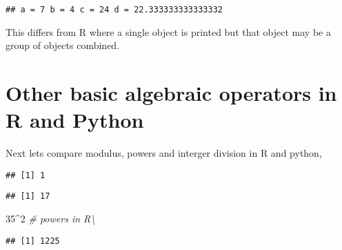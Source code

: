 \documentclass[]{book}
\newenvironment{Shaded}{\begin{snugshade}}{\end{snugshade}}
\newcommand{\DecValTok}[1]{\textcolor[rgb]{0.00,0.00,0.81}{#1}}
\newcommand{\StringTok}[1]{\textcolor[rgb]{0.31,0.60,0.02}{#1}}
\newcommand{\CommentTok}[1]{\textcolor[rgb]{0.56,0.35,0.01}{\textit{#1}}}
\newcommand{\OperatorTok}[1]{\textcolor[rgb]{0.81,0.36,0.00}{\textbf{#1}}}
\newcommand{\BuiltInTok}[1]{#1}
\newcommand{\NormalTok}[1]{#1}
\theoremstyle{definition}
\theoremstyle{definition}
\theoremstyle{definition}
\theoremstyle{remark}
\begin{document}
\begin{verbatim}
## a = 7 b = 4 c = 24 d = 22.333333333333332
\end{verbatim}

This differs from R where a single object is printed but that object may
be a group of objects combined.

\section{Other basic algebraic operators in R and
Python}\label{other-basic-algebraic-operators-in-r-and-python}

Next lets compare modulus, powers and interger division in R and python,

\begin{Shaded}
\end{Shaded}

\begin{verbatim}
## [1] 1
\end{verbatim}

\begin{Shaded}
\end{Shaded}

\begin{verbatim}
## [1] 17
\end{verbatim}

\begin{Shaded}
\begin{Highlighting}[]
\DecValTok{35}\OperatorTok{^}\DecValTok{2}        \CommentTok{# powers in R\textbackslash{}}
\end{Highlighting}
\end{Shaded}

\begin{verbatim}
## [1] 1225
\end{verbatim}

\begin{Shaded}
\end{Shaded}
\end{document}
